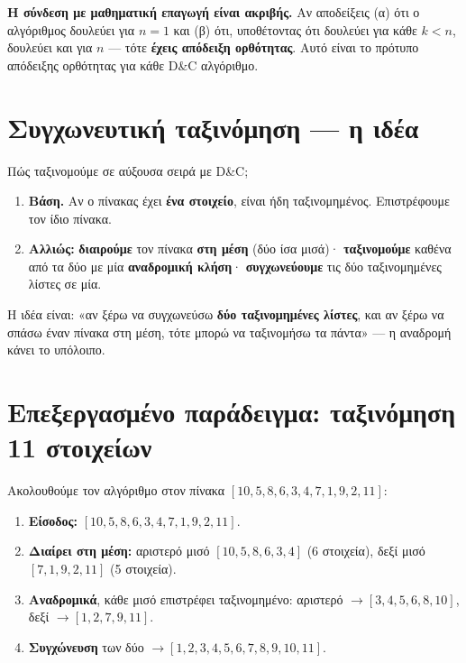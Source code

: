 \documentclass[11pt,a4paper]{article}
\begin{document}
\begin{keypoint}
\textbf{Η σύνδεση με μαθηματική επαγωγή είναι ακριβής.} Αν αποδείξεις (α) ότι ο
αλγόριθμος δουλεύει για $n = 1$ και (β) ότι, υποθέτοντας ότι δουλεύει για κάθε
$k < n$, δουλεύει και για $n$ --- τότε \textbf{έχεις απόδειξη ορθότητας}. Αυτό
είναι το πρότυπο απόδειξης ορθότητας για κάθε D\&C αλγόριθμο.
\end{keypoint}

\section{Συγχωνευτική ταξινόμηση --- η ιδέα}

Πώς ταξινομούμε σε αύξουσα σειρά με D\&C;

\begin{enumerate}
  \item \textbf{Βάση.} Αν ο πίνακας έχει \textbf{ένα στοιχείο}, είναι ήδη
  ταξινομημένος. Επιστρέφουμε τον ίδιο πίνακα.
  \item \textbf{Αλλιώς:} \textbf{διαιρούμε} τον πίνακα \textbf{στη μέση} (δύο ίσα
  μισά)· \textbf{ταξινομούμε} καθένα από τα δύο με μία \textbf{αναδρομική κλήση}·
  \textbf{συγχωνεύουμε} τις δύο ταξινομημένες λίστες σε μία.
\end{enumerate}

Η ιδέα είναι: «αν ξέρω να συγχωνεύσω \textbf{δύο ταξινομημένες λίστες}, και αν
ξέρω να σπάσω έναν πίνακα στη μέση, τότε μπορώ να ταξινομήσω τα πάντα» --- η
αναδρομή κάνει το υπόλοιπο.

\section{Επεξεργασμένο παράδειγμα: ταξινόμηση 11 στοιχείων}

Ακολουθούμε τον αλγόριθμο στον πίνακα $[10, 5, 8, 6, 3, 4, 7, 1, 9, 2, 11]$:

\begin{enumerate}
  \item \textbf{Είσοδος:} $[10, 5, 8, 6, 3, 4, 7, 1, 9, 2, 11]$.
  \item \textbf{Διαίρει στη μέση:} αριστερό μισό $[10, 5, 8, 6, 3, 4]$ (6
  στοιχεία), δεξί μισό $[7, 1, 9, 2, 11]$ (5 στοιχεία).
  \item \textbf{Αναδρομικά}, κάθε μισό επιστρέφει ταξινομημένο: αριστερό
  $\to [3, 4, 5, 6, 8, 10]$, δεξί $\to [1, 2, 7, 9, 11]$.
  \item \textbf{Συγχώνευση} των δύο $\to [1, 2, 3, 4, 5, 6, 7, 8, 9, 10, 11]$.
\end{enumerate}
\end{document}
